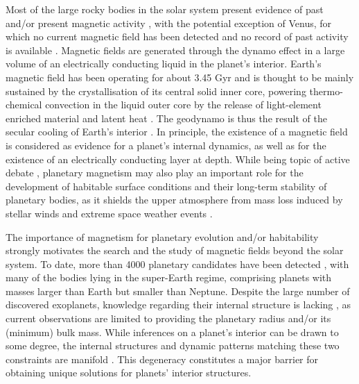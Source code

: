 \documentclass[draft]{agujournal2019} %
\begin{document}
Most of the large rocky bodies in the solar system present evidence of past and/or present magnetic activity \cite{stevenson_magnetism_1983,breuer_thermal_2010,schubert_planetary_2011}, with the potential exception of Venus, for which no current magnetic field has been detected and no record of past activity is available \cite{konopliv_venusian_1996,Nimmo2002,zhang2016weak,Dumoulin2017}. Magnetic fields are generated through the dynamo effect in a large volume of an electrically conducting liquid in the planet's interior.
Earth's magnetic field has been operating for about 3.45 Gyr \cite{tarduno2010geodynamo} and is thought to be mainly sustained by the crystallisation of its central solid inner core, powering thermo-chemical convection in the liquid outer core by the release of light-element enriched material and latent heat \cite{braginsky1963structure}. The geodynamo is thus the result of the secular cooling of Earth's interior \cite{labrosse_thermal_2003,buffett2003thermal}. In principle, the existence of a magnetic field is considered as evidence for a planet's internal dynamics, as well as for the existence of an electrically conducting layer at depth. While being topic of active debate \cite{moore2007stellar,strangeway2010does,brain2013planetary}, planetary magnetism may also play an important role for the development of habitable surface conditions and their long-term stability of planetary bodies, as it shields the upper atmosphere from mass loss induced by stellar winds and extreme space weather events \cite{dehant2007planetary,lammer2018origin,del2020inner}.

The importance of magnetism for planetary evolution and/or habitability strongly motivates the search and the study of magnetic fields beyond the solar system. To date, more than 4000 planetary candidates have been detected \cite{schneider2011defining,akeson2013nasa}, with many of the bodies lying in the super-Earth regime, comprising planets with masses larger than Earth but smaller than Neptune. Despite the large number of discovered exoplanets, knowledge regarding their internal structure is lacking \cite{spiegel_structure_2014,baraffe2014planetary}, as current observations are limited to providing the planetary radius and/or its (minimum) bulk mass. While inferences on a planet's interior can be drawn to some degree, the internal structures and dynamic patterns matching these two constraints are manifold \cite{rogers2010framework,howe2014mass}. This degeneracy constitutes a major barrier for obtaining unique solutions for planets' interior structures. 
\end{document}
